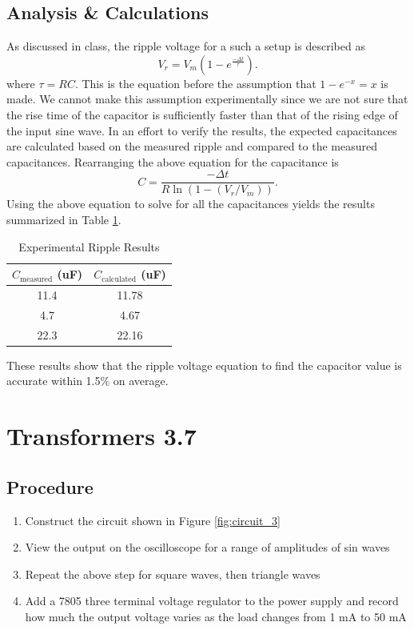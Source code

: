 \documentclass[12pt,letterpaper]{report}
\begin{document}


\subsection*{Analysis \& Calculations}
As discussed in class, the ripple voltage for a such a setup is described as
$$
V_r = V_m(1-e^{\frac{-\Delta t}{\tau}}).
$$
where $ \tau = RC $. This is the equation before the assumption that $1-e^{-x}=x$ is made. We cannot make this assumption experimentally since we are not sure that the rise time of the capacitor is sufficiently faster than that of the rising edge of the input sine wave.
In an effort to verify the results,  the expected capacitances are calculated based on the measured ripple and compared to the measured capacitances. Rearranging the above equation for the capacitance is
$$
C = \frac{-\Delta t}{R\ln (1-(V_r/V_m))}.
$$
Using the above equation to solve for all the capacitances yields the results summarized in Table \ref{table:c_comparisons}.

\begin{table}[ht]
\caption{Experimental Ripple Results} %
\centering 
    \begin{tabular}{| c | c |}
    \hline  
    $C_{\text{measured}}$ (uF) & $C_{\text{calculated}}$ (uF)\\
    \hline
    11.4 & 11.78 \\
    4.7 & 4.67 \\
    22.3 & 22.16 \\
    \hline
    \end{tabular}
    \label{table:c_comparisons}
\end{table}

These results show that the ripple voltage equation to find the capacitor value is accurate within  1.5\% on average.

\section*{Transformers 3.7}
\subsection*{Procedure}

\begin{enumerate}
\item Construct the circuit shown in Figure \ref{fig:circuit_3}
\item View the output on the oscilloscope for a range of amplitudes of sin waves
\item Repeat the above step for square waves, then triangle waves
\item Add a 7805 three terminal voltage regulator to the power supply and record how much the  output voltage varies as the load changes from 1 mA to 50 mA
\end{enumerate}
\end{document}
